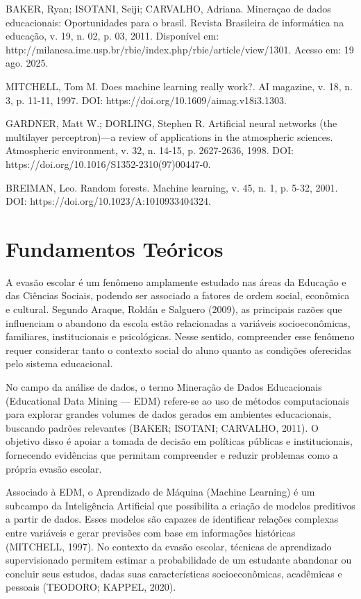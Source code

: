 \documentclass[english, spanish, brazilian]{RBIEarticle} %
\begin{document}
BAKER, Ryan; ISOTANI, Seiji; CARVALHO, Adriana. Mineraçao de dados educacionais: Oportunidades para o brasil. Revista Brasileira de informática na educação, v. 19, n. 02, p. 03, 2011. Disponível em: http://milanesa.ime.usp.br/rbie/index.php/rbie/article/view/1301. Acesso em: 19 ago. 2025.

MITCHELL, Tom M. Does machine learning really work?. AI magazine, v. 18, n. 3, p. 11-11, 1997. DOI: https://doi.org/10.1609/aimag.v18i3.1303.

GARDNER, Matt W.; DORLING, Stephen R. Artificial neural networks (the multilayer perceptron)—a review of applications in the atmospheric sciences. Atmospheric environment, v. 32, n. 14-15, p. 2627-2636, 1998. DOI: https://doi.org/10.1016/S1352-2310(97)00447-0.

BREIMAN, Leo. Random forests. Machine learning, v. 45, n. 1, p. 5-32, 2001. DOI: https://doi.org/10.1023/A:1010933404324.

\section{Fundamentos Teóricos}

A evasão escolar é um fenômeno amplamente estudado nas áreas da Educação e das Ciências Sociais, podendo ser associado a fatores de ordem social, econômica e cultural. Segundo Araque, Roldán e Salguero (2009), as principais razões que influenciam o abandono da escola estão relacionadas a variáveis socioeconômicas, familiares, institucionais e psicológicas. Nesse sentido, compreender esse fenômeno requer considerar tanto o contexto social do aluno quanto as condições oferecidas pelo sistema educacional. 

No campo da análise de dados, o termo Mineração de Dados Educacionais (Educational Data Mining — EDM) refere-se ao uso de métodos computacionais para explorar grandes volumes de dados gerados em ambientes educacionais, buscando padrões relevantes (BAKER; ISOTANI; CARVALHO, 2011). O objetivo disso é apoiar a tomada de decisão em políticas públicas e institucionais, fornecendo evidências que permitam compreender e reduzir problemas como a própria evasão escolar.

Associado à EDM, o Aprendizado de Máquina (Machine Learning) é um subcampo da Inteligência Artificial que possibilita a criação de modelos preditivos a partir de dados. Esses modelos são capazes de identificar relações complexas entre variáveis e gerar previsões com base em informações históricas (MITCHELL, 1997). No contexto da evasão escolar, técnicas de aprendizado supervisionado permitem estimar a probabilidade de um estudante abandonar ou concluir seus estudos, dadas suas características socioeconômicas, acadêmicas e pessoais (TEODORO; KAPPEL, 2020).
\end{document}

